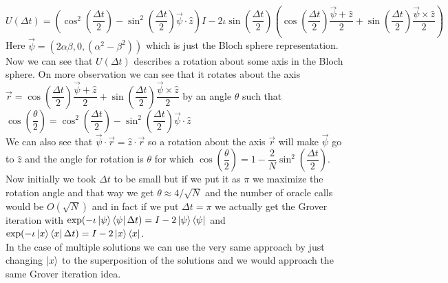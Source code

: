\documentclass{report}
\begin{document}
\begin{equation}
U(\Delta{t}) = \left(\cos^{2}\left(\dfrac{\Delta{t}}{2}\right) - \sin^{2}\left(\dfrac{\Delta{t}}{2}\right)\vec{\psi}\cdot\hat{z}\right)I - 2\iota\sin\left(\dfrac{\Delta{t}}{2}\right)\left(\cos\left(\dfrac{\Delta{t}}{2}\right)\dfrac{\vec{\psi} + \hat{z}}{2} + \sin\left(\dfrac{\Delta{t}}{2}\right)\dfrac{\vec{\psi}\times\hat{z}}{2}\right)
\end{equation}
Here $\vec{\psi} = (2\alpha\beta,0,(\alpha^2-\beta^2))$ which is just the Bloch sphere representation. Now we can see that $U(\Delta{t})$ describes a rotation about some axis in the Bloch sphere. On more observation we can see that it rotates about the axis $\vec{r} = \cos\left(\dfrac{\Delta{t}}{2}\right)\dfrac{\vec{\psi} + \hat{z}}{2} + \sin\left(\dfrac{\Delta{t}}{2}\right)\dfrac{\vec{\psi}\times\hat{z}}{2}$ by an angle $\theta$ such that $\cos\left(\dfrac{\theta}{2}\right) = \cos^{2}\left(\dfrac{\Delta{t}}{2}\right) - \sin^{2}\left(\dfrac{\Delta{t}}{2}\right)\vec{\psi}\cdot\hat{z}$\\
We can also see that $\vec{\psi}\cdot\vec{r} = \hat{z}\cdot\vec{r}$ so a rotation about the axis $\vec{r}$ will make $\vec{\psi}$ go to $\hat{z}$ and the angle for rotation is $\theta$ for which $\cos\left(\dfrac{\theta}{2}\right) = 1 - \dfrac{2}{N}\sin^{2}\left(\dfrac{\Delta{t}}{2}\right)$.\\
Now initially we took $\Delta{t}$ to be small but if we put it as $\pi$ we maximize the rotation angle and that way we get $\theta \approx 4/\sqrt{N}$ and the number of oracle calls would be $O(\sqrt{N})$ and in fact if we put $\Delta{t} = \pi$ we actually get the Grover iteration with $\exp(-\iota\ket{\psi}\bra{\psi}\Delta{t}) = I - 2\ket{\psi}\bra{\psi}$ and $\exp(-\iota\ket{x}\bra{x}\Delta{t}) = I - 2\ket{x}\bra{x}$.\\
In the case of multiple solutions we can use the very same approach by just changing $\ket{x}$ to the superposition of the solutions and we would approach the same Grover iteration idea.
\end{document}
